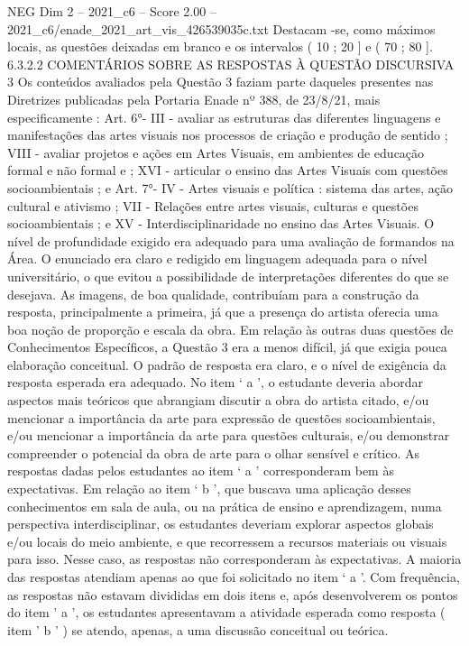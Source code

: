 \begin{textsample}{NEG Dim 2 – 2021\_c6 – Score 2.00 – 2021\_c6/enade\_2021\_art\_vis\_426539035c.txt}
Destacam -se, como máximos locais, as questões deixadas em branco e os intervalos ( 10 ; 20 ] e ( 70 ; 80 ]. 6.3.2.2 COMENTÁRIOS SOBRE AS RESPOSTAS À QUESTÃO DISCURSIVA 3 Os conteúdos avaliados pela Questão 3 faziam parte daqueles presentes nas Diretrizes publicadas pela Portaria Enade nº 388, de 23/8/21, mais especificamente : Art. 6{\EmojiFont °}- III - avaliar as estruturas das diferentes linguagens e manifestações das artes visuais nos processos de criação e produção de sentido ; VIII - avaliar projetos e ações em Artes Visuais, em ambientes de educação formal e não formal e ; XVI - articular o ensino das Artes Visuais com questões socioambientais ; e Art. 7{\EmojiFont °}- IV - Artes visuais e política : sistema das artes, ação cultural e ativismo ; VII - Relações entre artes visuais, culturas e questões socioambientais ; e XV - Interdisciplinaridade no ensino das Artes Visuais.
O nível de profundidade exigido era adequado para uma avaliação de formandos na Área.
O enunciado era claro e redigido em linguagem adequada para o nível universitário, o que evitou a possibilidade de interpretações diferentes do que se desejava.
As imagens, de boa qualidade, contribuíam para a construção da resposta, principalmente a primeira, já que a presença do artista oferecia uma boa noção de proporção e escala da obra.
Em relação às outras duas questões de Conhecimentos Específicos, a Questão 3 era a menos difícil, já que exigia pouca elaboração conceitual.
O padrão de resposta era claro, e o nível de exigência da resposta esperada era adequado.
No item ‘ a ’, o estudante deveria abordar aspectos mais teóricos que abrangiam discutir a obra do artista citado, e/ou mencionar a importância da arte para expressão de questões socioambientais, e/ou mencionar a importância da arte para questões culturais, e/ou demonstrar compreender o potencial da obra de arte para o olhar sensível e crítico.
As respostas dadas pelos estudantes ao item ‘ a ’ corresponderam bem às expectativas.
Em relação ao item ‘ b ’, que buscava uma aplicação desses conhecimentos em sala de aula, ou na prática de ensino e aprendizagem, numa perspectiva interdisciplinar, os estudantes deveriam explorar aspectos globais e/ou locais do meio ambiente, e que recorressem a recursos materiais ou visuais para isso.
Nesse caso, as respostas não corresponderam às expectativas.
A maioria das respostas atendiam apenas ao que foi solicitado no item ‘ a ’.
Com frequência, as respostas não estavam divididas em dois itens e, após desenvolverem os pontos do item ' a ', os estudantes apresentavam a atividade esperada como resposta ( item ' b ' ) se atendo, apenas, a uma discussão conceitual ou teórica.

\end{textsample}

